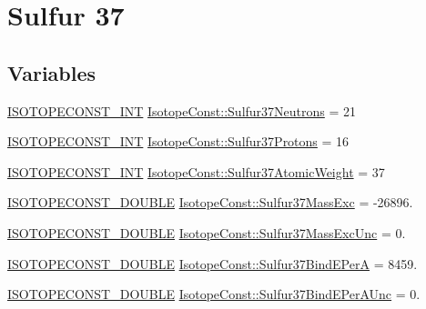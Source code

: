 \hypertarget{group___isotope_const-_sulfur-_s37}{}\section{Sulfur 37}
\label{group___isotope_const-_sulfur-_s37}
\subsection*{Variables}
\begin{DoxyCompactItemize}
\item 
\mbox{\hyperlink{group___isotope_const-_macros_ga5f18360b3e99483a35c32d789e62621c}{I\+S\+O\+T\+O\+P\+E\+C\+O\+N\+S\+T\+\_\+\+I\+NT}} \mbox{\hyperlink{group___isotope_const-_sulfur-_s37_gab18505546f8666a0eba888e81e18241c}{Isotope\+Const\+::\+Sulfur37\+Neutrons}} = 21
\item 
\mbox{\hyperlink{group___isotope_const-_macros_ga5f18360b3e99483a35c32d789e62621c}{I\+S\+O\+T\+O\+P\+E\+C\+O\+N\+S\+T\+\_\+\+I\+NT}} \mbox{\hyperlink{group___isotope_const-_sulfur-_s37_ga762990dbcf5b56cd76a59dd29998586a}{Isotope\+Const\+::\+Sulfur37\+Protons}} = 16
\item 
\mbox{\hyperlink{group___isotope_const-_macros_ga5f18360b3e99483a35c32d789e62621c}{I\+S\+O\+T\+O\+P\+E\+C\+O\+N\+S\+T\+\_\+\+I\+NT}} \mbox{\hyperlink{group___isotope_const-_sulfur-_s37_ga7928e190fc1c24b3effb4836ce016307}{Isotope\+Const\+::\+Sulfur37\+Atomic\+Weight}} = 37
\item 
\mbox{\hyperlink{group___isotope_const-_macros_ga8f45a7272ce02c0b4c65c44636ed719a}{I\+S\+O\+T\+O\+P\+E\+C\+O\+N\+S\+T\+\_\+\+D\+O\+U\+B\+LE}} \mbox{\hyperlink{group___isotope_const-_sulfur-_s37_ga4766d3ab6ca4d002a3e1e91a6e39f34e}{Isotope\+Const\+::\+Sulfur37\+Mass\+Exc}} = -\/26896.
\item 
\mbox{\hyperlink{group___isotope_const-_macros_ga8f45a7272ce02c0b4c65c44636ed719a}{I\+S\+O\+T\+O\+P\+E\+C\+O\+N\+S\+T\+\_\+\+D\+O\+U\+B\+LE}} \mbox{\hyperlink{group___isotope_const-_sulfur-_s37_ga89ec7a9bf7a094a028a634fd9797ece0}{Isotope\+Const\+::\+Sulfur37\+Mass\+Exc\+Unc}} = 0.
\item 
\mbox{\hyperlink{group___isotope_const-_macros_ga8f45a7272ce02c0b4c65c44636ed719a}{I\+S\+O\+T\+O\+P\+E\+C\+O\+N\+S\+T\+\_\+\+D\+O\+U\+B\+LE}} \mbox{\hyperlink{group___isotope_const-_sulfur-_s37_ga0c1380628ce47b946021306f22c22fc7}{Isotope\+Const\+::\+Sulfur37\+Bind\+E\+PerA}} = 8459.
\item 
\mbox{\hyperlink{group___isotope_const-_macros_ga8f45a7272ce02c0b4c65c44636ed719a}{I\+S\+O\+T\+O\+P\+E\+C\+O\+N\+S\+T\+\_\+\+D\+O\+U\+B\+LE}} \mbox{\hyperlink{group___isotope_const-_sulfur-_s37_ga07c8fc44c3ddc0a7653bcbdbdce31a04}{Isotope\+Const\+::\+Sulfur37\+Bind\+E\+Per\+A\+Unc}} = 0.

\end{DoxyCompactItemize}
